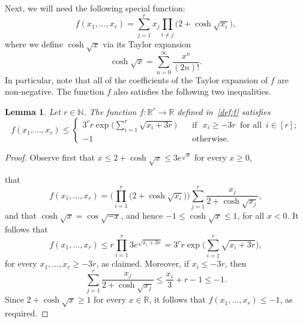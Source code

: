 \documentclass[12pt,reqno]{amsart}
\newtheorem{lemma}[theorem]{Lemma}
\theoremstyle{definition}
\theoremstyle{remark}
\newcommand\N{\mathbb{N}}
\newcommand\R{\mathbb{R}}
\renewcommand{\le}{\leqslant}
\renewcommand{\ge}{\geqslant}
\renewcommand{\to}{\rightarrow}
\def\R{\mathbb{R}}
\def\N{\mathbb{N}}
\begin{document}
Next, we will need the following special function:
%
\begin{equation}
	\label{def:f}
	f(x_1,\dots,x_r) = \sum_{j = 1}^r x_j \prod_{i \ne j} \big( 2 + \cosh\sqrt{x_i} \big),
\end{equation}
%
where we define \(\cosh \sqrt{x}\) via its Taylor expansion
%
\begin{equation*}
	\cosh\sqrt{x} = \sum_{n = 0}^\infty \frac{x^n}{(2n)!}.
\end{equation*}
%
In particular, note that all of the coefficients of the Taylor expansion of \(f\) are non-negative. The function \(f\) also satisfies the following two inequalities.

%
\begin{lemma}
	\label{lem:special:function}
	Let \(r \in \N\). The function \(f \colon \R^r \to \R\) defined in~\eqref{def:f} satisfies
	\begin{equation*}
		f(x_1,\dots,x_r) \le \left\{%
		\begin{array}{cl}
			3^r r \exp\bigg( \displaystyle\sum_{i = 1}^r \sqrt{ x_i + 3r } \bigg) \quad & \text{if } \,\, x_i \ge - 3r \,\text{ for all }\, i \in [r]; \\[+3ex]
			-1                                                                          & \text{otherwise.}

		\end{array}%
		\right.
	\end{equation*}
%
\end{lemma}
%
\begin{proof}
	Observe first that \(x \le 2 + \cosh\sqrt{x} \le 3e^{\sqrt{x}}\) for every \(x \ge 0\),

	that
	\begin{equation*}
		f(x_1,\dots,x_r) = \bigg( \prod_{i = 1}^r \big( 2 + \cosh \sqrt{x_i} \big) \bigg) \sum_{j = 1}^r \frac{x_j}{2+\cosh\sqrt{x_j}},
	\end{equation*}
	and that \(\cosh \sqrt{x} = \cos \sqrt{-x}\), and hence \(-1 \le \cosh \sqrt{x} \le 1\), for all \(x < 0\). It follows that
	\begin{equation*}
		f(x_1,\dots,x_r)\le r \prod_{i=1}^r 3e^{\sqrt{x_i + 3r}} =3^r r \exp\bigg(\sum_{i=1}^r \sqrt{x_i + 3r} \bigg),
	\end{equation*}
	for every \(x_1,\ldots,x_r \ge -3r\), as claimed. Moreover, if \(x_i \le -3r\), then
	\begin{equation*}
		\sum_{j = 1}^r \frac{x_j}{2+\cosh\sqrt{x_j}} \le \frac{x_i}{3} + r - 1 \le - 1.
	\end{equation*}
	Since \(2 + \cosh \sqrt{x} \ge 1\) for every \(x \in \R\), it follows that \(f(x_1,\dots,x_r) \le -1\), as required.
\end{proof}
%
\end{document}
